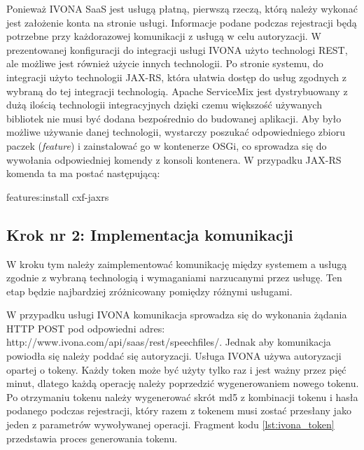 Ponieważ IVONA SaaS jest usługą płatną, pierwszą rzeczą, którą należy wykonać jest założenie konta na stronie usługi. Informacje podane podczas rejestracji będą potrzebne przy każdorazowej komunikacji z usługą w celu autoryzacji. W prezentowanej konfiguracji do integracji usługi IVONA użyto technologi REST, ale możliwe jest również użycie innych technologii. Po stronie systemu, do integracji użyto technologii JAX-RS, która ułatwia dostęp do usług zgodnych z wybraną do tej integracji technologią. Apache ServiceMix jest dystrybuowany z dużą ilością technologii integracyjnych dzięki czemu większość używanych bibliotek nie musi być dodana bezpośrednio do budowanej aplikacji. Aby było możliwe używanie danej technologii, wystarczy poszukać odpowiedniego zbioru paczek (\textit{feature}) i zainstalować go w kontenerze OSGi, co sprowadza się do wywołania odpowiedniej komendy z konsoli kontenera. W przypadku JAX-RS komenda ta ma postać następującą: 
\begin{center}
features:install cxf-jaxrs
\end{center}

\subsection {Krok nr 2: Implementacja komunikacji}

W kroku tym należy zaimplementować komunikację między systemem a usługą zgodnie z wybraną technologią i wymaganiami narzucanymi przez usługę. Ten etap będzie najbardziej zróżnicowany pomiędzy różnymi usługami.

W przypadku usługi IVONA komunikacja sprowadza się do wykonania żądania HTTP POST pod odpowiedni adres: http://www.ivona.com/api/saas/rest/speechfiles/. Jednak aby komunikacja powiodła się należy poddać się autoryzacji. Usługa IVONA używa autoryzacji opartej o tokeny. Każdy token może być użyty tylko raz i jest ważny przez pięć minut, dlatego każdą operację należy poprzedzić wygenerowaniem nowego tokenu. Po otrzymaniu tokenu należy wygenerować skrót md5 z kombinacji tokenu i hasła podanego podczas rejestracji, który razem z tokenem musi zostać przesłany jako jeden z parametrów wywoływanej operacji. Fragment kodu \ref{lst:ivona_token} przedstawia proces generowania tokenu.

\lstset{language=Java, tabsize=4, caption=Proces generowania tokenu usługi IVONA,label=lst:ivona_token}

